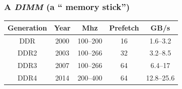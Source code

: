 \documentclass[xcolor={x11names,svgnames}]{beamer}
\begin{document}

\begin{frame}
  \frametitle{A \emph{DIMM} (a `` memory stick'')}


  \vfill
  
  \centering\small
  \begin{tabular}{|c|c|c|c|c|}
  \hline
  Generation     & Year & Mhz       & Prefetch  & GB/s \\
  \hline\hline                                                    
  DDR\phantom{1} & 2000  & 100--200  & 16        &  1.6--3.2 \\
  \hline                                                          
  DDR2           & 2003  & 100--266  & 32        &  3.2--8.5 \\
  \hline                                                          
  DDR3           & 2007  & 100--266  & 64        &  6.4--17 \\
  \hline                                                          
  DDR4           & 2014  & 200--400  & 64        &  12.8--25.6 \\
    \hline
\end{tabular}
\vfill
\end{frame}

\end{document}

